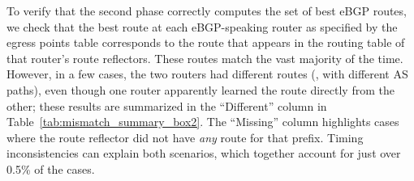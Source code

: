 
To verify that the second phase correctly computes the set of best eBGP
routes, 
we check that the best route at each eBGP-speaking router as specified by
the {\dfc egress points} table corresponds to the route that appears in
the routing table of that router's route reflectors. 
These routes
match the vast majority of the time.  However, in a few cases, the two
routers had different routes (\ie, with different AS paths), even
though one router apparently learned the route directly from the
other; these results are summarized in the ``Different'' column in
Table~\ref{tab:mismatch_summary_box2}.  The ``Missing'' column
highlights cases where the route reflector did not have {\em any\/}
route for that 
prefix.  Timing inconsistencies can explain both scenarios, which
together account for just over 0.5\% of the cases.

